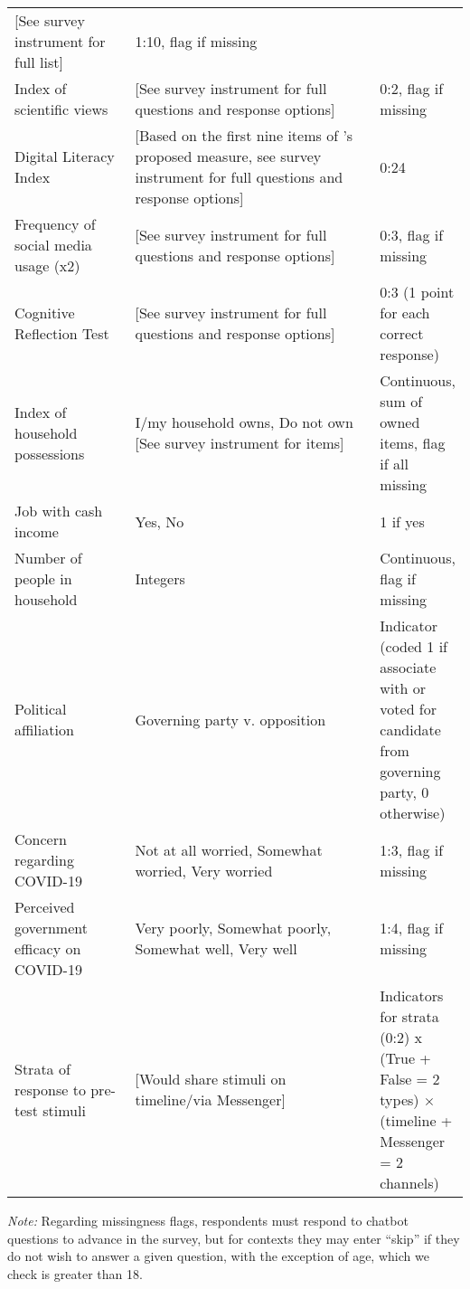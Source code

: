 \begin{table}[H]
\begin{adjustbox}{totalheight=.9\baselineskip, max width = \textwidth}
\begin{tabular}{p{0.3\linewidth}p{0.7\linewidth}p{0.25\linewidth}}
[See survey instrument for full list] & 1:10, flag if missing\\
Index   of scientific views                 & [See   survey instrument for full questions and response options] & 0:2, flag if missing                     \\
Digital Literacy Index &  {[}Based on the first nine items of \cite{guessetal2020digital}'s  proposed measure, see  survey instrument for full questions and response options{]}& 0:24\\
Frequency of social media usage (x2)& {[}See   survey instrument for full questions and response options{]} & 0:3, flag if missing \\
Cognitive Reflection Test& {[}See   survey instrument for full questions and response options{]}& 0:3 (1 point for each correct response)\\
Index of household possessions%
&
  I/my household owns, Do not own [See survey instrument for items] &
  Continuous, sum of owned items, flag if all missing \\
Job   with cash income                      & Yes,   No                                                  & 1 if yes                \\
Number   of people in household             & Integers                                                   & Continuous, flag if missing              \\
Political affiliation & Governing party v. opposition & Indicator (coded 1 if associate with or voted for candidate from governing party, 0 otherwise)\\
Concern regarding COVID-19                  & Not at all worried, Somewhat worried,  Very   worried      & 1:3, flag if missing                     \\
Perceived government efficacy   on COVID-19 & Very   poorly, Somewhat poorly, Somewhat well, Very well   & 1:4, flag if missing \\
{Strata of response to pre-test stimuli} & [Would share stimuli on timeline/via Messenger]& Indicators for strata (0:2) x (True + False = 2 types) $\times$ (timeline + Messenger = 2 channels) 
\end{tabular} 
\end{adjustbox}
\footnotesize
\textit{Note:} Regarding missingness flags, respondents must respond to chatbot questions to advance in the survey, but for contexts they may enter ``skip'' if they do not wish to answer a given question, with the exception of age, which we check is greater than 18. 
\end{table}